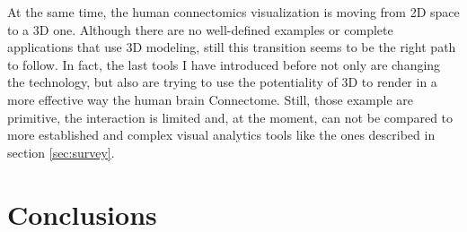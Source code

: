 \documentclass{article}
\begin{document}
\begin{multicols}{2}
At the same time, the human connectomics visualization is moving from 2D space to a 3D one. Although there are no well-defined examples or complete applications that use 3D modeling, still this transition seems to be the right path to follow. In fact, the last tools I have introduced before not only are changing the technology, but also are trying to use the potentiality of 3D to render in a more effective way the human brain Connectome. Still, those example are primitive, the interaction is limited and, at the moment, can not be compared to more established and complex visual analytics tools like the ones described in section \ref{sec:survey}.

\section{Conclusions}
\label{sec:conclusions}
{}
  





\end{multicols}
\end{document}

